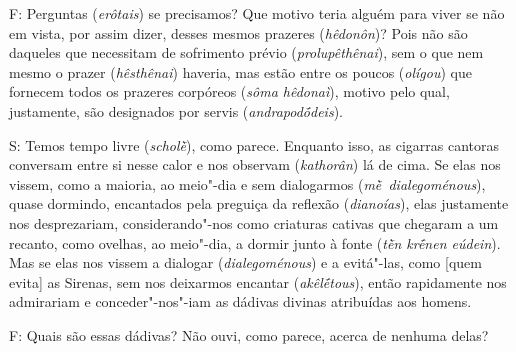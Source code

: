 \bekker{[258e]} F: Perguntas (\emph{erôtais}) se precisamos? Que motivo teria
alguém para viver se não em vista, por assim dizer, desses mesmos
prazeres (\emph{hêdonôn})? Pois não são daqueles que necessitam de
sofrimento prévio (\emph{prolupêthênai}), sem o que nem mesmo o prazer
(\emph{hêsthênai}) haveria, mas estão entre os poucos (\emph{olígou})
que fornecem todos os prazeres corpóreos (\emph{sôma hêdonaì}), motivo
pelo qual, justamente, são designados por servis (\emph{andrapodṓdeis}).

S: Temos tempo livre (\emph{scholḕ}), como parece. Enquanto isso, as
cigarras cantoras conversam entre si nesse calor e nos observam
(\emph{kathorân}) lá de cima. \bekker{[259a]} Se elas nos vissem, como a
maioria, ao meio"-dia e sem dialogarmos (\emph{mḕ~dialegoménous}), quase
dormindo, encantados pela preguiça da reflexão (\emph{dianoías}), elas
justamente nos desprezariam, considerando"-nos como criaturas cativas que
chegaram a um recanto, como ovelhas, ao meio"-dia, a dormir junto à fonte
(\emph{tḕn krḗnen eúdein}). Mas se elas nos vissem a dialogar
(\emph{dialegoménous}) e a evitá"-las, como [quem evita] as Sirenas,
sem nos deixarmos encantar (\emph{akêlḗtous}), então rapidamente nos
admirariam e conceder"-nos"-iam as dádivas divinas atribuídas aos
homens.

\bekker{[259b]} F: Quais são essas dádivas? Não ouvi, como parece, acerca de
nenhuma delas?

